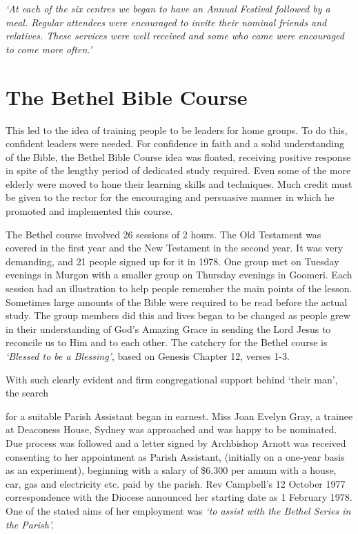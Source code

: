 \emph{`At each of the six centres we began to have an Annual Festival followed by a meal. Regular attendees were encouraged to invite their nominal friends and relatives. These services were well received and some who came were encouraged to come more often.'}



\section{The Bethel Bible Course}



This led to the idea of training people to be leaders for home groups. To do this, confident leaders were needed. For confidence in faith and a solid understanding of the Bible, the Bethel Bible Course idea was floated, receiving positive response in spite of the lengthy period of dedicated study required. Even some of the more elderly were moved to hone their learning skills and techniques. Much credit must be given to the rector for the encouraging and persuasive manner in which he promoted and implemented this course.



The Bethel course involved 26 sessions of 2  hours. The Old Testament was covered in the first year and the New Testament in the second year. It was very demanding, and 21 people signed up for it in 1978. One group met on Tuesday evenings in Murgon with a smaller group on Thursday evenings in Goomeri. Each session had an illustration to help people remember the main points of the lesson. Sometimes large amounts of the Bible were required to be read before the actual study. The group members did this and lives began to be changed as people grew in their understanding of God's Amazing Grace in sending the Lord Jesus to reconcile us to Him and to each other. The catchcry for the Bethel course is \emph{`Blessed to be a Blessing'}, based on Genesis Chapter 12, verses 1-3.



With such clearly evident and firm congregational support behind `their man', the search



for a suitable Parish Assistant began in earnest. Miss Joan Evelyn Gray, a trainee at Deaconess House, Sydney was approached and was happy to be nominated. Due process was followed and a letter signed by Archbishop Arnott was received consenting to her appointment as Parish Assistant, (initially on a one-year basis as an experiment), beginning with a salary of \$6,300 per annum with a house, car, gas and electricity etc. paid by the parish. Rev Campbell's 12 October 1977 correspondence with the Diocese announced her starting date as 1 February 1978. One of the stated aims of her employment was \emph{`to assist with the Bethel Series in the Parish'.}









